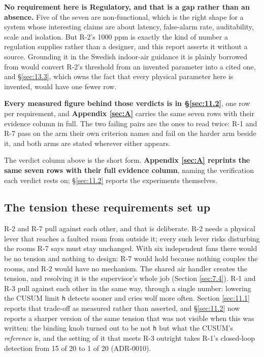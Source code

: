 \textbf{No requirement here is Regulatory, and that is a gap rather than an absence.} Five of the
seven are non-functional, which is the right shape for a system whose interesting claims are about
latency, false-alarm rate, auditability, scale and isolation. But R-2's 1000 ppm is exactly the kind
of number a regulation supplies rather than a designer, and this report asserts it without a source.
Grounding it in the Swedish indoor-air guidance it is plainly borrowed from would convert R-2's
threshold from an invented parameter into a cited one, and §\ref{sec:13.3}, which owns the fact that every
physical parameter here is invented, would have one fewer row.

\textbf{Every measured figure behind those verdicts is in §\ref{sec:11.2}}, one row per requirement, and
\textbf{Appendix \ref{sec:A}} carries the same seven rows with their evidence column in full. The two failing
pairs are the ones to read twice: R-1 and R-7 pass on the arm their own criterion names and fail on
the harder arm beside it, and both arms are stated wherever either appears.

The verdict column above is the short form. \textbf{Appendix \ref{sec:A} reprints the same seven rows with
their full evidence column}, naming the verification each verdict rests on; §\ref{sec:11.2} reports the
experiments themselves.

\subsection{The tension these requirements set up}\label{sec:3.1}

R-2 and R-7 pull against each other, and that is deliberate. R-2 needs a physical lever that
reaches a faulted room from outside it; every such lever risks disturbing the rooms R-7 says must
stay unchanged. With six independent fans there would be no tension and nothing to design: R-7
would hold because nothing couples the rooms, and R-2 would have no mechanism. The shared air
handler creates the tension, and resolving it is the supervisor's whole job (Section \ref{sec:7.4}). R-1 and
R-3 pull against each other in the same way, through a single number: lowering the CUSUM limit
\texttt{h} detects sooner and cries wolf more often. Section \ref{sec:11.1} reports that trade-off as
measured rather than asserted, and §\ref{sec:11.2} now reports a sharper version of the same tension that was
not visible when this was written: the binding knob turned out to be not \texttt{h} but what the
CUSUM's \emph{reference} is, and the setting of it that meets R-3 outright takes R-1's closed-loop
detection from 15 of 20 to 1 of 20 (ADR-0010).

